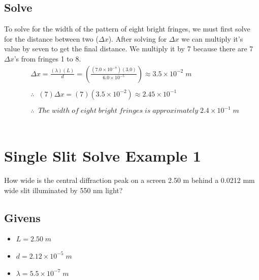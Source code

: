 \documentclass{article}
\begin{document}
\subsection*{Solve}
To solve for the width of the pattern of eight bright fringes, we must first solve for the distance between two ($\Delta x$). After solving for $\Delta x$ we can multiply it's value by seven to get the final distance. We multiply it by 7 because there are 7 $\Delta x$'s from fringes 1 to 8.\\
\begin{align*}
     & \Delta x = \frac{(\lambda)(L)}{d} = \left(\frac{(7.0 \times 10^{-7})(3.0)}{6.0 \times 10^{-5}}\right) \approx 3.5 \times 10^{-2}\;m \\\\
     & \therefore\;\;(7)\Delta x = (7)(3.5 \times 10^{-2}) \approx 2.45 \times 10^{-1} \\\\
     & \therefore\;\;The\;width\;of\;eight\;bright\;fringes\;is\;approximately\;2.4 \times 10^{-1}\;m
\end{align*}\leavevmode\\

\vspace{3cm}

\section{Single Slit Solve Example 1}
How wide is the central diffraction peak on a screen 2.50 m behind a 0.0212 mm wide slit illuminated by 550 nm light?
\subsection*{Givens}
\begin{itemize}
    \item $L = 2.50\;m$
    \item $d = 2.12 \times 10^{-5}\;m$
    \item $\lambda = 5.5 \times 10^{-7}\;m$
\end{itemize}\leavevmode
\end{document}
